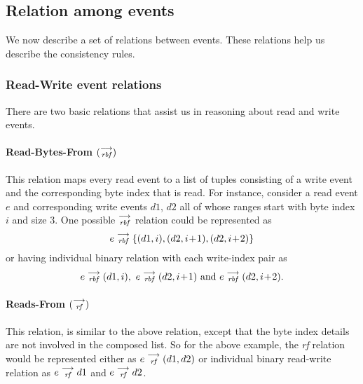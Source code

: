     \subsection{Relation among events}
    
        We now describe a set of relations between events. These relations help us describe the consistency rules.
        
        \subsubsection{Read-Write event relations}
        There are two basic relations that assist us in reasoning about read and write events.
        
            \paragraph{Read-Bytes-From $(\stackrel{\longrightarrow}{_\textit{rbf}})$}
        
            This relation maps every read event to a list of tuples consisting of a write event and the corresponding byte index that is read. For instance, consider a read event $e$ and corresponding write events $d1$, $d2$ all of whose ranges start with byte index $i$ and size 3. One possible $\stackrel{\longrightarrow}{_\textit{rbf}}$ relation could be represented as  
                \[e\stackrel{\longrightarrow}{_{\textit{\textit{rbf}}}}\{(d1, i), (d2, i\!+\!1), (d2, i\!+\!2)\} \]
            or having individual binary relation with each write-index pair as 
                \begin{align*}
                    e\stackrel{\longrightarrow}{_{\textit{rbf}}}(d1, i),\ e\stackrel{\longrightarrow}{_{\textit{rbf}}}(d2, i\!+\!1)  \text{ and } e\stackrel{\longrightarrow}{_{\textit{rbf}}}(d2, i\!+\!2).
                \end{align*}
                
            \paragraph{Reads-From $(\stackrel{\longrightarrow}{_\textit{rf}})$}
            
            This relation, is similar to the above relation, except that the byte index details are not involved in the composed list. So for the above example, the \textit{rf} relation would be represented either as   
                $e\stackrel{\longrightarrow}{_{\textit{rf}}}(d1, d2)$
            or individual binary read-write relation as 
                $e\stackrel{\longrightarrow}{_{\textit{rf}}}d1$ and $e\stackrel{\longrightarrow}{_{\textit{rf}}}d2$.
        
